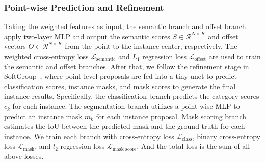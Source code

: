 \subsubsection{Point-wise Prediction and Refinement}
Taking the weighted features as input, the semantic branch and offset branch apply two-layer MLP and output the semantic scores $S\in \mathcal{R}^{N \times K}$ and offset vectors  $O\in \mathcal{R}^{N \times K}$  from the point to the instance center, respectively. The weighted cross-entropy loss $\mathcal{L}_{\text {semantic}}$ and $L_1$ regression loss $\mathcal{L}_{\text {offset}} $ are used to train the semantic and offset branches. After that, we follow the refinement stage in SoftGroup~\cite{vu2022softgroup}, where point-level proposals are fed into a tiny-unet to predict classification scores, instance masks, and mask scores to generate the final instance results. Specifically, the classification branch predicts the category scores $c_k$ for each instance. The segmentation branch utilizes a point-wise MLP to predict an instance mask $m_k$ for each instance proposal. Mask scoring branch estimates the IoU between the predicted mask and the ground truth for each instance. We train each branch with cross-entropy loss $\mathcal{L}_{\text {class}}$, binary cross-entropy loss $\mathcal{L}_{\text {mask}}$, and $l_2$ regression loss $\mathcal{L}_{\text{mask score}}$. And the total loss is the sum of all above losses.





